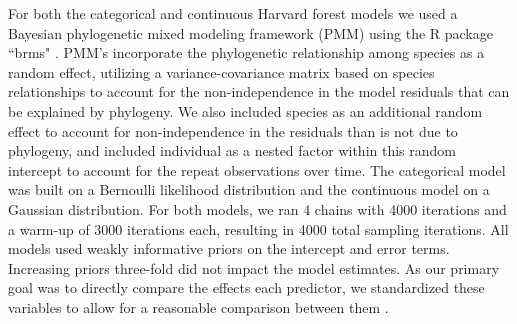\documentclass[12pt]{article}\usepackage[]{graphicx}\usepackage[]{color}
\begin{document}
For both the categorical and continuous Harvard forest models we used a Bayesian phylogenetic mixed modeling framework (PMM) \citep{Garamszegi2014} using the R package ``brms" \citep{Burkner2018}. PMM's incorporate the phylogenetic relationship among species as a random effect, utilizing a variance-covariance matrix based on species relationships to account for the non-independence in the model residuals that can be explained by phylogeny. We also included species as an additional random effect to account for non-independence in the residuals than is not due to phylogeny, and included individual as a nested factor within this random intercept to account for the repeat observations over time. The categorical model was built on a Bernoulli likelihood distribution and the continuous model on a Gaussian distribution. For both models, we ran 4 chains with 4000 iterations and a warm-up of 3000 iterations each, resulting in 4000 total sampling iterations. All models used weakly informative priors on the intercept and error terms. Increasing priors three-fold did not impact the model estimates. As our primary goal was to directly compare the effects each predictor, we standardized these variables to allow for a reasonable comparison between them {\citep{Gelman2007}. \\

%
%
%
%

}
\end{document}
